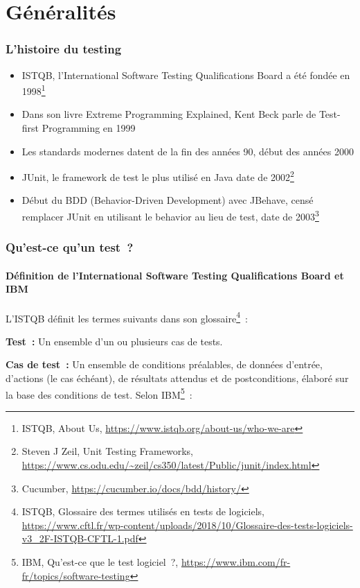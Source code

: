 \documentclass{beamer}
\begin{document}
    \section{Généralités}\label{sec:generalites}
    \begin{frame}
        \transdissolve
        \frametitle{L'histoire du testing}

        \begin{itemize}

            \item ISTQB, l'International Software Testing Qualifications Board a été fondée en 1998\footnote{ISTQB, About Us, \url{https://www.istqb.org/about-us/who-we-are}}
            \item Dans son livre Extreme Programming Explained, Kent Beck parle de Test-first Programming en 1999
            \item Les standards modernes datent de la fin des années 90, début des années 2000
            \item JUnit, le framework de test le plus utilisé en Java date de 2002\footnote{Steven J Zeil, Unit Testing Frameworks, \url{https://www.cs.odu.edu/~zeil/cs350/latest/Public/junit/index.html}}
            \item Début du BDD (Behavior-Driven Development) avec JBehave, censé remplacer JUnit en utilisant le behavior au lieu de test, date de 2003\footnote{Cucumber, \url{https://cucumber.io/docs/bdd/history/}}
        \end{itemize}

    \end{frame}

    \begin{frame}
        \frametitle{Qu’est-ce qu’un test~?}
        \framesubtitle{Définition de l'International Software Testing Qualifications Board et IBM}
        \transdissolve
        L’ISTQB définit les termes suivants dans son glossaire\footnote{ISTQB, Glossaire des termes utilisés en tests de logiciels, \url{https://www.cftl.fr/wp-content/uploads/2018/10/Glossaire-des-tests-logiciels-v3_2F-ISTQB-CFTL-1.pdf}}~:

        \textbf{Test~:} Un ensemble d’un ou plusieurs cas
        de tests.

        \textbf{Cas de test~:} Un ensemble de conditions
        préalables, de données d'entrée, d'actions
        (le cas échéant), de résultats attendus et
        de postconditions, élaboré sur la base des
        conditions de test.
        \bigbreak
        Selon IBM\footnote{IBM, Qu'est-ce que le test logiciel~?, \url{https://www.ibm.com/fr-fr/topics/software-testing}}~:

    \end{frame}
\end{document}
